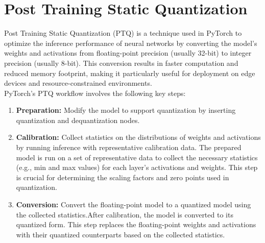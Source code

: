 \section{Post Training Static Quantization}
Post Training Static Quantization (PTQ) is a technique used in PyTorch to optimize the inference performance of neural networks by converting the model's weights and activations from floating-point precision (usually 32-bit) to integer precision (usually 8-bit). This conversion results in faster computation and reduced memory footprint, making it particularly useful for deployment on edge devices and resource-constrained environments.
\\
PyTorch's PTQ workflow involves the following key steps:
\begin{enumerate}
    \item \textbf{Preparation:}  Modify the model to support quantization by inserting quantization and dequantization nodes.
    \item \textbf{Calibration:} Collect statistics on the distributions of weights and activations by running inference with representative calibration data. The prepared model is run on a set of representative data to collect the necessary statistics (e.g., min and max values) for each layer's activations and weights. This step is crucial for determining the scaling factors and zero points used in quantization.
    \item \textbf{Conversion:} Convert the floating-point model to a quantized model using the collected statistics.After calibration, the model is converted to its quantized form. This step replaces the floating-point weights and activations with their quantized counterparts based on the collected statistics.
\end{enumerate}

